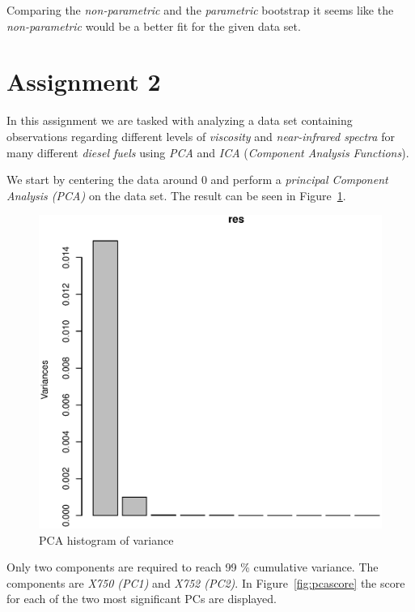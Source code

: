 \documentclass[a4paper,12pt]{article}
\begin{document}
    Comparing the \textit{non-parametric} and the \textit{parametric} bootstrap it seems like the \textit{non-parametric} would be a better fit for the given data set. 

    \section{Assignment 2}
    In this assignment we are tasked with analyzing a data set containing observations regarding different levels of \emph{viscosity} and \emph{near-infrared spectra} for many different \emph{diesel fuels} using \emph{PCA} and \emph{ICA} (\emph{Component Analysis Functions}).

    We start by centering the data around 0 and perform a \emph{principal Component Analysis (PCA)} on the data set. The result can be seen in Figure~\ref{fig:pcahist}.

    \begin{figure}[H]            \centering
    \caption{PCA histogram of variance}
    \label{fig:pcahist}
    \includegraphics[width=\textwidth]{figures/A2_pcahist.eps}
    \end{figure}

    Only two components are required to reach 99 \% cumulative variance. The components are \emph{X750 (PC1)} and \emph{X752 (PC2)}. In Figure~\ref{fig:pcascore} the score for each of the two most significant PCs are displayed.
\end{document}

